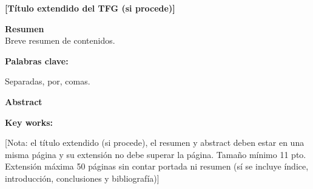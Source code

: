 
\newpage

\thispagestyle{empty}

{\bf \large [Título extendido del TFG (si procede)]}

\vspace{0.5cm}

{\bf \large Resumen}\\
Breve resumen de contenidos.


\vspace{5cm}


{\bf Palabras clave:}


   
   Separadas, por, comas.
   
   \vspace{1 cm}


{\bf \large Abstract}\\

\vspace{5cm}

{\bf Key works:}

\vspace{0.9cm}
\begin{center}
[Nota: el título extendido (si procede), el resumen y abstract deben estar en una misma página y su extensión no debe superar la página. Tamaño mínimo 11 pto.\\

Extensión máxima 50 páginas sin contar portada ni resumen (sí se incluye índice, introducción, conclusiones y bibliografía)]\\
\end{center}
  